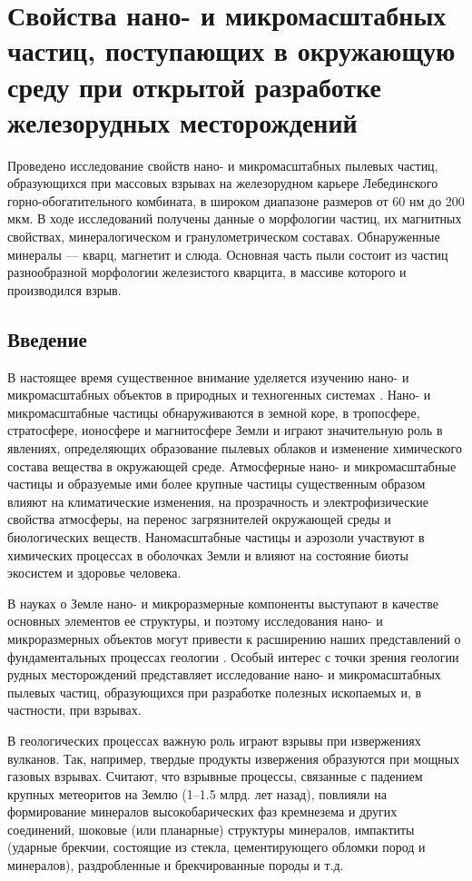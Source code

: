 \chapter{Свойства нано- и микромасштабных частиц, поступающих в окружающую среду при открытой разработке железорудных месторождений} \label{chapt2}

Проведено исследование свойств нано- и микромасштабных пылевых частиц, образующихся при массовых взрывах на железорудном карьере Лебединского горно-обогатительного комбината, в широком диапазоне размеров от 60 нм до 200 мкм. В ходе исследований получены данные о морфологии частиц, их магнитных свойствах, минералогическом и гранулометрическом составах. Обнаруженные минералы — кварц, магнетит и слюда. Основная часть пыли состоит из частиц разнообразной морфологии железистого кварцита, в массиве которого и производился взрыв.

\section{Введение} \label{sect2_1}

В настоящее время существенное внимание уделяется изучению нано- и микромасштабных объектов в природных и техногенных системах \cite{bib09,bib18}. Нано- и микромасштабные частицы обнаруживаются в земной коре, в тропосфере, стратосфере, ионосфере и магнитосфере Земли \cite{bib02,bib03,bib04,bib05,bib08,bib12,bib14,bib19} и играют значительную роль в явлениях, определяющих образование пылевых облаков и изменение химического состава вещества в окружающей среде. Атмосферные нано- и микромасштабные частицы и образуемые ими более крупные частицы существенным образом влияют на климатические изменения, на прозрачность и электрофизические свойства атмосферы, на перенос загрязнителей окружающей среды и биологических веществ. Наномасштабные частицы и аэрозоли участвуют в химических процессах в оболочках Земли и влияют на состояние биоты экосистем и здоровье человека. 

В науках о Земле нано- и микроразмерные компоненты выступают в качестве основных элементов ее структуры, и поэтому исследования нано- и микроразмерных объектов могут привести к расширению наших представлений о фундаментальных процессах геологии \cite{bib09}. Особый интерес с точки зрения геологии рудных месторождений представляет исследование нано- и микромасштабных пылевых частиц, образующихся при разработке полезных ископаемых и, в частности, при взрывах.

В геологических процессах важную роль играют взрывы при извержениях вулканов. Так, например, твердые продукты извержения образуются при мощных газовых взрывах. Считают, что взрывные процессы, связанные с падением крупных метеоритов на Землю (1–1.5 млрд. лет назад), повлияли на формирование минералов высокобарических фаз кремнезема и других соединений, шоковые (или планарные) структуры минералов, импактиты (ударные брекчии, состоящие из стекла, цементирующего обломки пород и минералов), раздробленные и брекчированные породы и т.д. 

